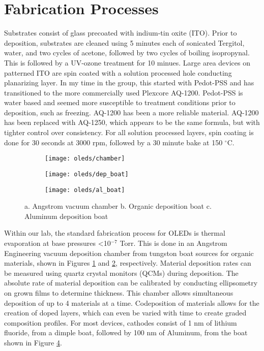 \documentclass[../thesis.tex]{subfiles}
\begin{document}
\section{Fabrication Processes}

Substrates consist of glass precoated with indium-tin oxite (ITO).  
Prior to deposition, substrates are cleaned using 5 minutes each of sonicated Tergitol, water, and two cycles of acetone, followed by two cycles of boiling isopropynal.  
This is followed by a UV-ozone treatment for 10 minues.  
Large area devices on patterned ITO are spin coated with a solution processed hole conducting planarizing layer.
In my time in the group, this started with Pedot-PSS and has transitioned to the more commercially used Plexcore AQ-1200.
Pedot-PSS is water based and seemed more susceptible to treatment conditions prior to deposition, such as freezing.
AQ-1200 has been a more reliable material.
AQ-1200 has been replaced with AQ-1250, which appears to be the same formula, but with tighter control over consistency.
For all solution processed layers, spin coating is done for 30 seconds at 3000 rpm, followed by a 30 minute bake at 150 $^\circ$C.

\begin{figure}[ht]
    \centering
    \begin{subfigure}{.3\textwidth}
    \texttt{[image: oleds/chamber]}
    \caption{}
    \label{fig:oleds_angstrom}\par\vfill
    \end{subfigure}
    \begin{subfigure}{.3\textwidth}
    \texttt{[image: oleds/dep\_boat]}
    \caption{}
    \label{fig:oleds_deposition_boat}
    \end{subfigure}
    \begin{subfigure}{.3\textwidth}
    \texttt{[image: oleds/al\_boat]}
    \caption{}
    \label{fig:oleds_al_boat}
    \end{subfigure}
\caption{a. Angstrom vacuum chamber b. Organic deposition boat c. Aluminum deposition boat}
\end{figure}

Within our lab, the standard fabrication process for OLEDs is thermal evaporation at base pressures <10$^{-7}$ Torr.  
This is done in an Angstrom Engineering vacuum deposition chamber from tungston boat sources for organic materials, shown in Figures \ref{fig:oleds_angstrom} and \ref{fig:oleds_deposition_boat}, respectively.
Material deposition rates can be measured using quartz crystal monitors (QCMs) during deposition.
The absolute rate of material deposition can be calibrated by conducting ellipsometry on grown films to determine thickness.
This chamber allows simultaneous deposition of up to 4 materials at a time.
Codeposition of materials allows for the creation of doped layers, which can even be varied with time to create graded composition profiles.
For most devices, cathodes consist of 1 nm of lithium fluoride, from a dimple boat, followed by 100 nm of Aluminum, from the boat shown in Figure \ref{fig:oleds_al_boat}.
\end{document}
